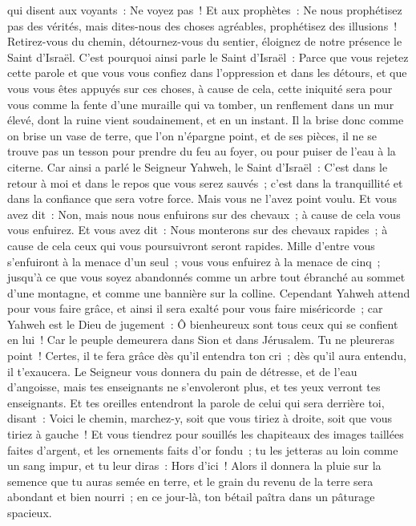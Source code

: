 \begin{multicols}{2}
qui disent aux voyants~: Ne voyez pas~! Et aux prophètes~: Ne nous prophétisez pas des vérités, mais dites-nous des choses agréables, prophétisez des illusions~!
Retirez-vous du chemin, détournez-vous du sentier, éloignez de notre présence le Saint d'Israël.
C'est pourquoi ainsi parle le Saint d'Israël~: Parce que vous rejetez cette parole et que vous vous confiez dans l'oppression et dans les détours, et que vous vous êtes appuyés sur ces choses,
à cause de cela, cette iniquité sera pour vous comme la fente d'une muraille qui va tomber, un renflement dans un mur élevé, dont la ruine vient soudainement, et en un instant.
Il la brise donc comme on brise un vase de terre, que l'on n'épargne point, et de ses pièces, il ne se trouve pas un tesson pour prendre du feu au foyer, ou pour puiser de l'eau à la citerne.
Car ainsi a parlé le Seigneur Yahweh, le Saint d'Israël~: C'est dans le retour à moi et dans le repos que vous serez sauvés~; c'est dans la tranquillité et dans la confiance que sera votre force. Mais vous ne l'avez point voulu.
Et vous avez dit~: Non, mais nous nous enfuirons sur des chevaux~; à cause de cela vous vous enfuirez. Et vous avez dit~: Nous monterons sur des chevaux rapides~; à cause de cela ceux qui vous poursuivront seront rapides.
Mille d'entre vous s'enfuiront à la menace d'un seul~; vous vous enfuirez à la menace de cinq~; jusqu'à ce que vous soyez abandonnés comme un arbre tout ébranché au sommet d'une montagne, et comme une bannière sur la colline.
Cependant Yahweh attend pour vous faire grâce, et ainsi il sera exalté pour vous faire miséricorde~; car Yahweh est le Dieu de jugement~: Ô bienheureux sont tous ceux qui se confient en lui~!
Car le peuple demeurera dans Sion et dans Jérusalem. Tu ne pleureras point~! Certes, il te fera grâce dès qu'il entendra ton cri~; dès qu'il aura entendu, il t'exaucera.
Le Seigneur vous donnera du pain de détresse, et de l'eau d'angoisse, mais tes enseignants ne s'envoleront plus, et tes yeux verront tes enseignants.
Et tes oreilles entendront la parole de celui qui sera derrière toi, disant~: Voici le chemin, marchez-y, soit que vous tiriez à droite, soit que vous tiriez à gauche~!
Et vous tiendrez pour souillés les chapiteaux des images taillées faites d'argent, et les ornements faits d'or fondu~; tu les jetteras au loin comme un sang impur, et tu leur diras~: Hors d'ici~!
Alors il donnera la pluie sur la semence que tu auras semée en terre, et le grain du revenu de la terre sera abondant et bien nourri~; en ce jour-là, ton bétail paîtra dans un pâturage spacieux.

\end{multicols}
